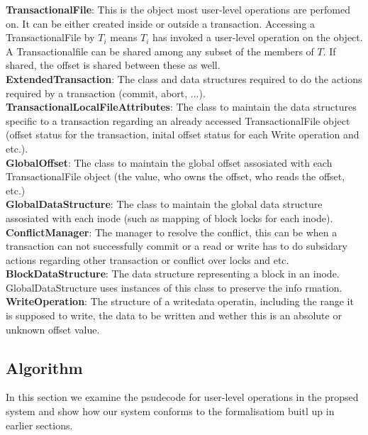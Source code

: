 \documentclass[a4paper, 11pt]{article}
\begin{document}
\textbf{TransactionalFile}: This is the object most user-level operations are perfomed on. It can be either created inside or outside a transaction. Accessing a TransactionalFile by $T_i$ means $T_i$ has invoked a user-level operation on the object. A Transactionalfile can be shared among any subset of the members of $T$. If shared, the offset is shared between these as well.\\

\textbf{ExtendedTransaction}: The class and data structures required to do the actions required by a transaction (commit, abort, ...).\\

\textbf{TransactionalLocalFileAttributes}: The class to maintain the data structures specific to a transaction regarding an already accessed TransactionalFile object (offset status for the transaction, inital offset status for each Write operation and etc.).\\

\textbf{GlobalOffset}: The class to maintain the global offset assosiated with each TransactionalFile object (the value, who owns the offset, who reads the offset, etc.) \\

\textbf{GlobalDataStructure}: The class to maintain the global data structure assosiated with each inode (such as mapping of block locks for each inode).\\

\textbf{ConflictManager}: The manager to resolve the conflict, this can be  when a transaction can not successfully commit  or a read or write has to do subsidary actions regarding other transaction or conflict over locks and etc.\\ 

\textbf{BlockDataStructure}: The data structure representing a block in an inode. GlobalDataStructure uses instances of this class to preserve the info
rmation.\\

\textbf{WriteOperation}: The structure of a writedata operatin, including the range it is supposed to write, the data to be written and wether this is an absolute or unknown offset value.\\

\subsection{Algorithm}

In this section we examine the psudecode for user-level operations in the propsed system and show how our system conforms to the formalisatiom buitl up in earlier sections.
\end{document}
